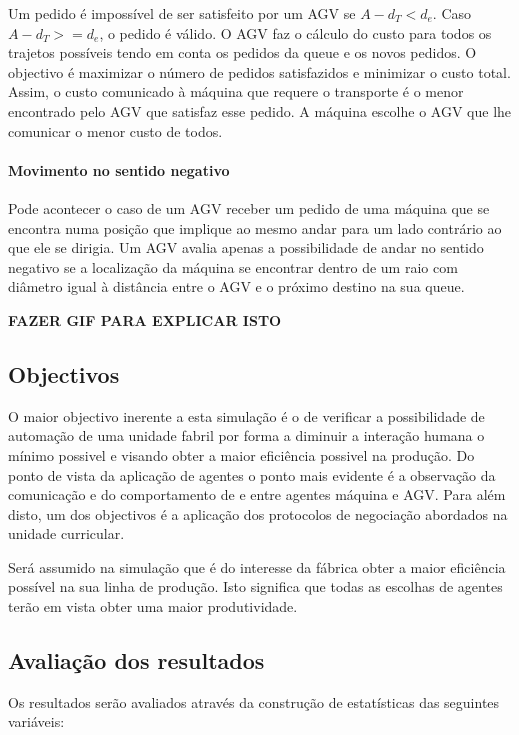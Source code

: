\begin{titlepage}
Um pedido é impossível de ser satisfeito por um AGV se $A-d_{T} < d_{e}$. Caso $A-d_{T} >= d_{e}$, o pedido é válido. O AGV faz o cálculo do custo para todos os trajetos possíveis tendo em conta os pedidos da queue e os novos pedidos. O objectivo é maximizar o número de pedidos satisfazidos e minimizar o custo total. Assim, o custo comunicado à máquina que requere o transporte é o menor encontrado pelo AGV que satisfaz esse pedido. A máquina escolhe o AGV que lhe comunicar o menor custo de todos.

\paragraph{Movimento no sentido negativo}

Pode acontecer o caso de um AGV receber um pedido de uma máquina que se encontra numa posição que implique ao mesmo andar para um lado contrário ao que ele se dirigia. Um AGV avalia apenas a possibilidade de andar no sentido negativo se a localização da máquina se encontrar dentro de um raio com diâmetro igual à distância entre o AGV e o próximo destino na sua queue.\newline

\textbf{FAZER GIF PARA EXPLICAR ISTO}

\subsection{Objectivos}
\justify\normalsize
O maior objectivo inerente a esta simulação é o de verificar a possibilidade de automação de uma unidade fabril por forma a diminuir a interação humana o mínimo possivel e visando obter a maior eficiência possivel na produção. Do ponto de vista da aplicação de agentes o ponto mais evidente é a observação da comunicação e do comportamento de e entre agentes máquina e AGV. Para além disto, um dos objectivos é a aplicação dos protocolos de negociação abordados na unidade curricular.

Será assumido na simulação que é do interesse da fábrica obter a maior eficiência possível na sua linha de produção. Isto significa que todas as escolhas de agentes terão em vista obter uma maior produtividade.

\subsection{Avaliação dos resultados}
\justify\normalsize
Os resultados serão avaliados através da construção de estatísticas das seguintes variáveis:


\end{titlepage}
